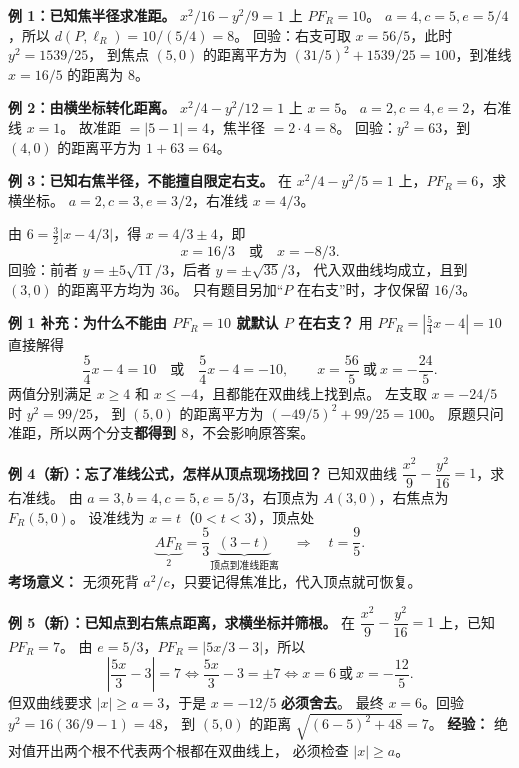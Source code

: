 \begin{examplebox}
\textbf{例 1：已知焦半径求准距。}
$x^2/16-y^2/9=1$ 上 $PF_R=10$。
$a=4,c=5,e=5/4$，所以 $d(P,\ell_R)=10/(5/4)=\boxed8$。
回验：右支可取 $x=56/5$，此时 $y^2=1539/25$，
到焦点 $(5,0)$ 的距离平方为 $(31/5)^2+1539/25=100$，到准线 $x=16/5$ 的距离为 $8$。

\medskip
\textbf{例 2：由横坐标转化距离。}
$x^2/4-y^2/12=1$ 上 $x=5$。
$a=2,c=4,e=2$，右准线 $x=1$。
故准距 $=|5-1|=\boxed4$，焦半径 $=2\cdot4=\boxed8$。
回验：$y^2=63$，到 $(4,0)$ 的距离平方为 $1+63=64$。
\end{examplebox}
\clearpage
\begin{examplebox}
\textbf{例 3：已知右焦半径，不能擅自限定右支。}
在 $x^2/4-y^2/5=1$ 上，$PF_R=6$，求横坐标。
$a=2,c=3,e=3/2$，右准线 $x=4/3$。

由 $6=\tfrac32|x-4/3|$，得 $x=4/3\pm4$，即
\[
\boxed{x=16/3\quad\text{或}\quad x=-8/3}.
\]
回验：前者 $y=\pm5\sqrt{11}/3$，后者 $y=\pm\sqrt{35}/3$，
代入双曲线均成立，且到 $(3,0)$ 的距离平方均为 $36$。
只有题目另加“$P$ 在右支”时，才仅保留 $16/3$。
\end{examplebox}
\clearpage
\clearpage
\begin{examplebox}

\medskip
\textbf{例 1 补充：为什么不能由 $PF_R=10$ 就默认 $P$ 在右支？}
用 $PF_R=|\frac54x-4|=10$ 直接解得
\[
\frac54x-4=10\quad\text{或}\quad\frac54x-4=-10,
\qquad \boxed{x=\frac{56}{5}\ \text{或}\ x=-\frac{24}{5}}.
\]
两值分别满足 $x\ge4$ 和 $x\le-4$，且都能在双曲线上找到点。
左支取 $x=-24/5$ 时 $y^2=99/25$，
到 $(5,0)$ 的距离平方为 $(-49/5)^2+99/25=100$。
原题只问准距，所以两个分支\textbf{都得到 $8$}，不会影响原答案。

\end{examplebox}
\clearpage
\begin{examplebox}
\medskip
\textbf{例 4（新）：忘了准线公式，怎样从顶点现场找回？}
已知双曲线 $\dfrac{x^2}{9}-\dfrac{y^2}{16}=1$，求右准线。
由 $a=3,b=4,c=5,e=5/3$，右顶点为 $A(3,0)$，右焦点为 $F_R(5,0)$。
设准线为 $x=t$（$0<t<3$），顶点处
\[
\underbrace{AF_R}_{2}=\frac53\underbrace{(3-t)}_{\text{顶点到准线距离}}
\quad\Longrightarrow\quad
\boxed{t=\frac95}.
\]
\textbf{考场意义：} 无须死背 $a^2/c$，只要记得焦准比，代入顶点就可恢复。

\medskip
\textbf{例 5（新）：已知点到右焦点距离，求横坐标并筛根。}
在 $\dfrac{x^2}{9}-\dfrac{y^2}{16}=1$ 上，已知 $PF_R=7$。
由 $e=5/3$，$PF_R=|5x/3-3|$，所以
\[
\left|\frac{5x}{3}-3\right|=7
\Longleftrightarrow \frac{5x}{3}-3=\pm7
\Longleftrightarrow \boxed{x=6\ \text{或}\ x=-\frac{12}{5}}.
\]
但双曲线要求 $|x|\ge a=3$，于是 $x=-12/5$ \textbf{必须舍去}。
最终 $\boxed{x=6}$。回验 $y^2=16(36/9-1)=48$，
到 $(5,0)$ 的距离 $\sqrt{(6-5)^2+48}=7$。
\textbf{经验：} 绝对值开出两个根不代表两个根都在双曲线上，
必须检查 $|x|\ge a$。

\medskip
\end{examplebox}
